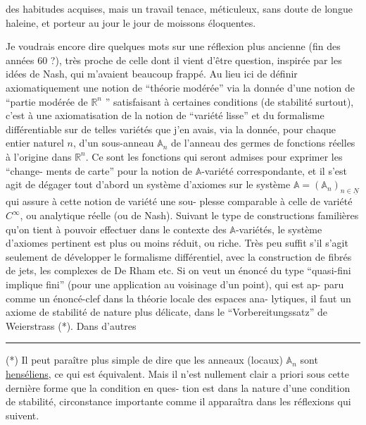
des habitudes acquises, mais un travail tenace, méticuleux, sans
doute de longue haleine, et porteur au jour le jour de moissons
éloquentes.

Je voudrais encore dire quelques mots sur une réflexion
plus ancienne (fin des années 60 ?), très proche de celle dont il
vient d'être question, inspirée par les idées de Nash, qui m'avaient
beaucoup frappé. Au lieu ici de définir axiomatiquement une notion
de ``théorie modérée'' via la donnée d'une notion de ``partie modérée
de $\mathbb{R}^n$ '' satisfaisant à certaines conditions (de stabilité surtout),
c'est à une axiomatisation de la notion de ``variété lisse'' et du
formalisme différentiable sur de telles variétés que j'en avais,
via la donnée, pour chaque entier naturel $n$, d'un sous-anneau
$\mathbb{A}_n$ de l'anneau des germes de fonctions réelles à l'origine dans $\mathbb{R}^n$.
Ce sont les fonctions qui seront admises pour exprimer les ``change-%
ments de carte'' pour la notion de $\mathbb{A}$-variété correspondante, et il
s'est agit de dégager tout d'abord un système d'axiomes sur le
système $\mathbb{A} = (\mathbb{A}_n)_{n\in\underline{N}}$ qui assure à cette notion de variété une sou-%
plesse comparable à celle de variété $C^\infty$, ou analytique réelle
(ou de Nash). Suivant le type de constructions familières qu'on
tient à pouvoir effectuer dans le contexte des $\mathbb{A}$-variétés, le
système d'axiomes pertinent est plus ou moins réduit, ou riche.
Très peu suffit s'il s'agit seulement de développer le formalisme
différentiel, avec la construction de fibrés de jets, les complexes
de De Rham etc. Si on veut un énoncé du type ``quasi-fini implique
fini'' (pour une application au voisinage d'un point), qui est ap-%
paru comme un énoncé-clef dans la théorie locale des espaces ana-%
lytiques, il faut un axiome de stabilité de nature plus délicate,
dans le ``Vorbereitungssatz'' de Weierstrass (*). Dans d'autres

\rule{4cm}{0.4pt}

(*) Il peut paraître plus simple de dire que les anneaux (locaux)
$\mathbb{A}_n$ sont \uline{henséliens}, ce qui est équivalent. Mais il n'est nullement
clair a priori sous cette dernière forme que la condition en ques-%
tion est dans la nature d'une condition de stabilité, circonstance
importante comme il apparaîtra dans les réflexions qui suivent.

